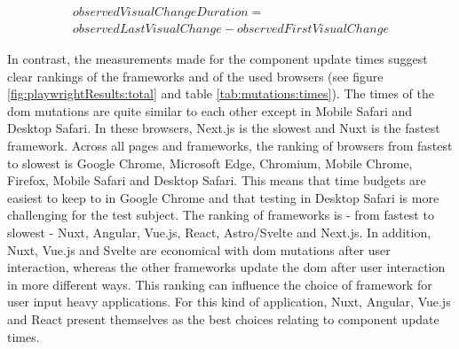 \documentclass[a4paper, 12pt]{article}
\begin{document}
\begin{multline}\label{eq:ovcd}
  \mathit{observedVisualChangeDuration} =\\ \mathit{observedLastVisualChange} - \mathit{observedFirstVisualChange}
\end{multline}

In contrast, the measurements made for the component update times suggest clear rankings of the frameworks and of the used browsers (see figure \ref{fig:playwrightResults:total} and table \ref{tab:mutations:times}).
The times of the \acrshort{dom} mutations are quite similar to each other except in Mobile Safari and Desktop Safari.
In these browsers, Next.js is the slowest and Nuxt is the fastest framework.
Across all pages and frameworks, the ranking of browsers from fastest to slowest is Google Chrome, Microsoft Edge, Chromium, Mobile Chrome, Firefox, Mobile Safari and Desktop Safari.
This means that time budgets are easiest to keep to in Google Chrome and that testing in Desktop Safari is more challenging for the test subject.
The ranking of frameworks is - from fastest to slowest - Nuxt, Angular, Vue.js, React, Astro/Svelte and Next.js.
In addition, Nuxt, Vue.js and Svelte are economical with \acrshort{dom} mutations after user interaction, whereas the other frameworks update the \acrshort{dom} after user interaction in more different ways.
This ranking can influence the choice of framework for user input heavy applications.
For this kind of application, Nuxt, Angular, Vue.js and React present themselves as the best choices relating to component update times.
\end{document}
